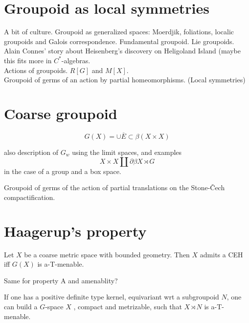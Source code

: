 \section{Groupoid as local symmetries}

A bit of culture. Groupoid as generalized spaces: Moerdjik, foliations, localic groupoids and Galois correspondence. Fundamental groupoid. Lie groupoids. Alain Connes' story about Heisenberg's discovery on Heligoland Island (maybe this fits more in $C^*$-algebras.\\

Actions of groupoids. $R[G]$ and $M[X]$.\\

Groupoid of germs of an action by partial homeomorphisms. (Local symmetries)

\section{Coarse groupoid}

\[G(X) = \cup \overline E \subset \beta (X\times X )\]

also description of $G_w$ using the limit spaces, and examples \[X\times X \coprod \partial\beta X \rtimes G\] in the case of a group and a box space.

Groupoid of germs of the action of partial translations on the Stone-\v{C}ech compactification.

\section{Haagerup's property}

\begin{thm} Let $X$ be a coarse metric space with bounded geometry.
Then $X$ admits a CEH iff $G(X)$ is a-T-menable.
\end{thm}  

Same for property A and amenablity?

\begin{prop}
If one has a positive definite type kernel, equivariant wrt a subgroupoid $N$, one can build a $G$-space $X$ , compact and metrizable, such that $X\rtimes N$ is a-T-menable.
\end{prop}

